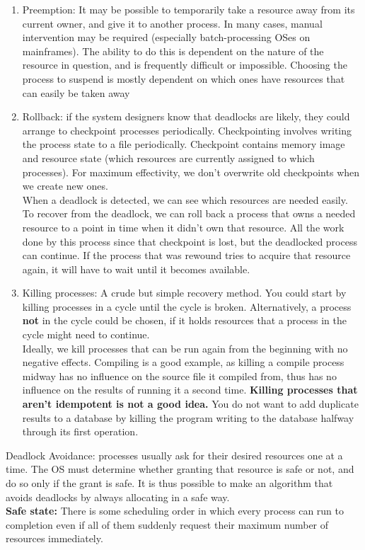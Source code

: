 \documentclass{article}
\begin{document}
\begin{enumerate}
	\item Preemption: It may be possible to temporarily take a resource away from its current owner, and give it to another process. In many cases, manual intervention may be required (especially batch-processing OSes on mainframes). The ability to do this is dependent on the nature of the resource in question, and is frequently difficult or impossible. Choosing the process to suspend is mostly dependent on which ones have resources that can easily be taken away
	\item Rollback: if the system designers know that deadlocks are likely, they could arrange to checkpoint processes periodically. Checkpointing involves writing the process state to a file periodically. Checkpoint contains memory image and resource state (which resources are currently assigned to which processes). For maximum effectivity, we don't overwrite old checkpoints when we create new ones. 
	\\When a deadlock is detected, we can see which resources are needed easily. To recover from the deadlock, we can roll back a process that owns a needed resource to a point in time when it didn't own that resource. All the work done by this process since that checkpoint is lost, but the deadlocked process can continue. If the process that was rewound tries to acquire that resource again, it will have to wait until it becomes available.
	\item Killing processes: A crude but simple recovery method. You could start by killing processes in a cycle until the cycle is broken. Alternatively, a process \textbf{not} in the cycle could be chosen, if it holds resources that a process in the cycle might need to continue. 
	\\Ideally, we kill processes that can be run again from the beginning with no negative effects. Compiling is a good example, as killing a compile process midway has no influence on the source file it compiled from, thus has no influence on the results of running it a second time. \textbf{Killing processes that aren't idempotent is not a good idea.} You do not want to add duplicate results to a database by killing the program writing to the database halfway through its first operation.
\end{enumerate}
Deadlock Avoidance: processes usually ask for their desired resources one at a time. The OS must determine whether granting that resource is safe or not, and do so only if the grant is safe. It is thus possible to make an algorithm that avoids deadlocks by always allocating in a safe way.
\\\textbf{Safe state:} There is some scheduling order in which every process can run to completion even if all of them suddenly request their maximum number of resources immediately.
\end{document}

